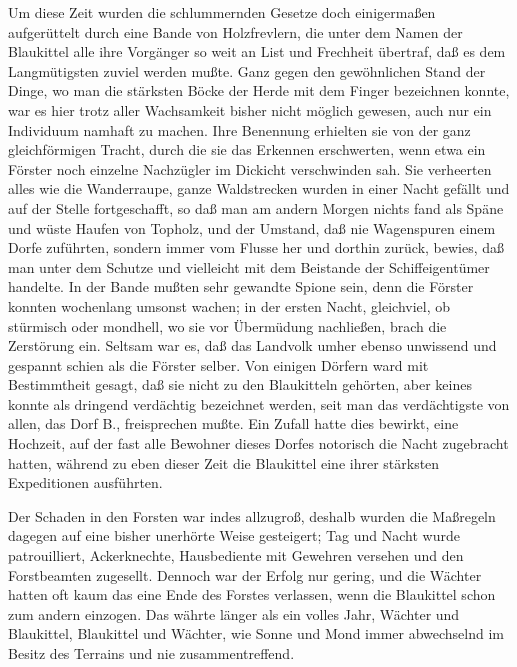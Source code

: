 Um diese Zeit wurden die schlummernden Gesetze doch einigermaßen aufgerüttelt durch eine Bande von Holzfrevlern, die unter dem Namen der Blaukittel alle ihre Vorgänger so weit an List und Frechheit übertraf, daß es dem Langmütigsten zuviel werden mußte. Ganz gegen den gewöhnlichen Stand der Dinge, wo man die stärksten Böcke der Herde mit dem Finger bezeichnen konnte, war es hier trotz aller Wachsamkeit bisher nicht möglich gewesen, auch nur ein Individuum namhaft zu machen. Ihre Benennung erhielten sie von der ganz gleichförmigen Tracht, durch die sie das Erkennen erschwerten, wenn etwa ein Förster noch einzelne Nachzügler im Dickicht verschwinden sah. Sie verheerten alles wie die Wanderraupe, ganze Waldstrecken wurden in einer Nacht gefällt und auf der Stelle fortgeschafft, so daß man am andern Morgen nichts fand als Späne und wüste Haufen von Topholz, und der Umstand, daß nie Wagenspuren einem Dorfe zuführten, sondern immer vom Flusse her und dorthin zurück, bewies, daß man unter dem Schutze und vielleicht mit dem Beistande der Schiffeigentümer handelte. In der Bande mußten sehr gewandte Spione sein, denn die Förster konnten wochenlang umsonst wachen; in der ersten Nacht, gleichviel, ob stürmisch oder mondhell, wo sie vor Übermüdung nachließen, brach die Zerstörung ein. Seltsam war es, daß das Landvolk umher ebenso unwissend und gespannt schien als die Förster selber. Von einigen Dörfern ward mit Bestimmtheit gesagt, daß sie nicht zu den Blaukitteln gehörten, aber keines konnte als dringend verdächtig bezeichnet werden, seit man das verdächtigste von allen, das Dorf B., freisprechen mußte. Ein Zufall hatte dies bewirkt, eine Hochzeit, auf der fast alle Bewohner dieses Dorfes notorisch die Nacht zugebracht hatten, während zu eben dieser Zeit die Blaukittel eine ihrer stärksten Expeditionen ausführten.

Der Schaden in den Forsten war indes allzugroß, deshalb wurden die Maßregeln dagegen auf eine bisher unerhörte Weise gesteigert; Tag und Nacht wurde patrouilliert, Ackerknechte, Hausbediente mit Gewehren versehen und den Forstbeamten zugesellt. Dennoch war der Erfolg nur gering, und die Wächter hatten oft kaum das eine Ende des Forstes verlassen, wenn die Blaukittel schon zum andern einzogen. Das währte länger als ein volles Jahr, Wächter und Blaukittel, Blaukittel und Wächter, wie Sonne und Mond immer abwechselnd im Besitz des Terrains und nie zusammentreffend.

